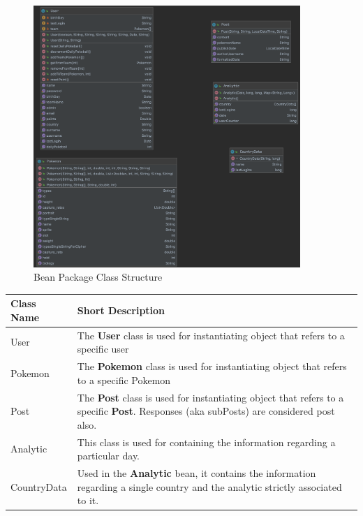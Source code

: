 \begin{figure}[H]
	\centering
	\includegraphics[width=0.9\textwidth]{img/bean_package.png}
	\caption{Bean Package Class Structure}
\end{figure}

\begingroup
\setlength{\tabcolsep}{10pt} %
\renewcommand{\arraystretch}{1.5} %
\begin{center}
	\begin{longtable}{| m{9em} | m{22em} |} 
		\hline
		\textbf{Class Name} & \textbf{Short Description} \\ [0.5ex] 
		\hline
		User & The \textbf{User} class is used for instantiating object that refers to a specific user\\ 
		\hline
		Pokemon & The \textbf{Pokemon} class is used for instantiating object that refers to a specific Pokemon\\
		\hline
		Post & The \textbf{Post} class is used for instantiating object that refers to a specific \textbf{Post}. Responses (aka subPosts) are considered post also.\\
		\hline
		Analytic & This class is used for containing the information regarding a particular day.\\
		\hline
		CountryData & Used in the \textbf{Analytic} bean, it contains the information regarding a single country and the analytic strictly associated to it.\\
		\hline
	\end{longtable}
\end{center}
\endgroup


